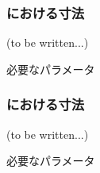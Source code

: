 \subsubsection{\EndFaceBoringMilling における寸法\TBW}
(to be written...)
\begin{Parameter}{必要なパラメータ}
\PMEndFaceBoringWidth
\PMEndFaceBoringCornerR
\PMEndFaceBoringDepth
\PMEndFaceBoringLength\\
\PMACOD
\PMBDOD
\end{Parameter}

\subsubsection{\IncutMilling における寸法\TBW}
(to be written...)
\begin{Parameter}{必要なパラメータ}
\end{Parameter}


\clearpage
